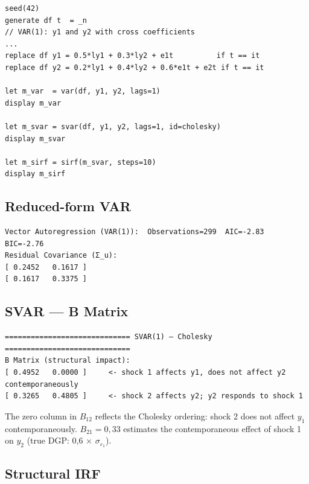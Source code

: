 \begin{lstlisting}[caption={Structural DGP and Cholesky SVAR}]
seed(42)
generate df t  = _n
// VAR(1): y1 and y2 with cross coefficients
...
replace df y1 = 0.5*ly1 + 0.3*ly2 + e1t          if t == it
replace df y2 = 0.2*ly1 + 0.4*ly2 + 0.6*e1t + e2t if t == it

let m_var  = var(df, y1, y2, lags=1)
display m_var

let m_svar = svar(df, y1, y2, lags=1, id=cholesky)
display m_svar

let m_sirf = sirf(m_svar, steps=10)
display m_sirf
\end{lstlisting}

\subsection*{Reduced-form VAR}

\begin{lstlisting}[language={}, basicstyle=\ttfamily\small,
  frame=none, numbers=none, backgroundcolor=\color{codbg},
  xleftmargin=0pt, xrightmargin=0pt, breaklines=false]
Vector Autoregression (VAR(1)):  Observations=299  AIC=-2.83  BIC=-2.76
Residual Covariance (Σ_u):
[ 0.2452   0.1617 ]
[ 0.1617   0.3375 ]
\end{lstlisting}

\subsection*{SVAR — B Matrix}

\begin{lstlisting}[language={}, basicstyle=\ttfamily\small,
  frame=none, numbers=none, backgroundcolor=\color{codbg},
  xleftmargin=0pt, xrightmargin=0pt, breaklines=false]
============================= SVAR(1) — Cholesky =============================
B Matrix (structural impact):
[ 0.4952   0.0000 ]     <- shock 1 affects y1, does not affect y2 contemporaneously
[ 0.3265   0.4805 ]     <- shock 2 affects y2; y2 responds to shock 1
\end{lstlisting}

The zero column in $B_{12}$ reflects the Cholesky ordering: shock 2 does not affect
$y_1$ contemporaneously. $B_{21} = 0{,}33$ estimates the contemporaneous effect of
shock 1 on $y_2$ (true DGP: 0{,}6 $\times$ $\sigma_{\varepsilon_1}$).

\subsection*{Structural IRF}


